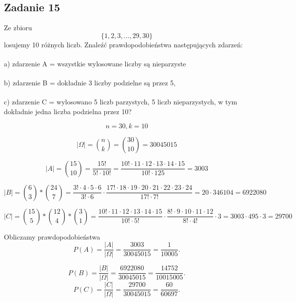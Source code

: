 \subsection{Zadanie 15}

Ze zbioru
\[
 \{1, 2, 3,... ,29, 30\}
\]
 losujemy 10 różnych liczb. Znaleźć prawdopodobieństwa następujących zdarzeń:
 \\
\\a) zdarzenie A = wszystkie wylosowane liczby są nieparzyste
\\
\\ b) zdarzenie B = dokładnie 3 liczby podzielne są przez 5,
\\
\\ c) zdarzenie C = wylosowano 5 liczb parzystych, 5 liczb nieparzystych, w tym dokładnie jedna liczba podzielna przez 10?

\[
n=30,k=10
\]

\[
|\Omega|={n \choose k}={30 \choose 10} = 30045015
\]

\[
|A|={15 \choose 10} = \frac{15!}{5!\cdot10!} = \frac{10 !\cdot 11 \cdot 12 \cdot 13 \cdot 14 \cdot 15}{10! \cdot 125} = 3003
\]

\[
|B|={6 \choose 3} * {24 \choose 7} = \frac{3! \cdot 4 \cdot 5 \cdot 6}{3! \cdot 6} \cdot \frac{17!\cdot18\cdot19\cdot20\cdot21\cdot22\cdot23\cdot24}{17!\cdot7!}= 20 \cdot 346104 = 6 922 080 
\]

\[|C|={15 \choose 5} * {12 \choose 4} * {3 \choose 1} = \frac{10! \cdot 11 \cdot 12 \cdot 13 \cdot 14 \cdot 15}{10! \cdot 5!}  \cdot \frac{8!\cdot9\cdot10\cdot11\cdot12}{8!\cdot4!} \cdot 3= 3003 \cdot 495 \cdot 3 = 29 700\]

Obliczamy prawdopodobieństwa
\[
P(A)=\frac{|A|}{|\Omega|}=\frac{3003}{30045015}=\frac{1}{10005}.
\]

\[
P(B)=\frac{|B|}{|\Omega|}=\frac{ 6 922 080 }{30045015}=\frac{14752}{10 015 005}.
\]
\[
P(C)=\frac{|C|}{|\Omega|}=\frac{ 29 700}{30045015}=\frac{60}{60697}.
\]

